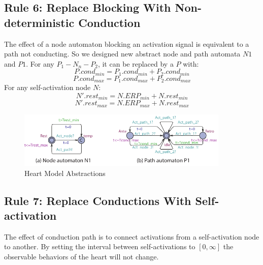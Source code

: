 
\subsection{Rule 6: Replace Blocking With Non-deterministic Conduction}
The effect of a node automaton blocking an activation signal is equivalent to a path not conducting. So we designed new abstract node and path automata $N1$ and $P1$. For any $P_1-N_n-P_2$, it can be replaced by a $P$ with:
$$P.cond_{min}=P_1.cond_{min}+P_2.cond_{min}$$
$$P.cond_{max}=P_1.cond_{max}+P_2.cond_{max}$$
For any self-activation node $N$:
$$N'.rest_{min}=N.ERP_{min}+N.rest_{min}$$
$$N'.rest_{max}=N.ERP_{max}+N.rest_{max}$$

\begin{figure}[!h]
		\centering
		\includegraphics[width=0.9\textwidth]{figs/rule5.pdf}
		\caption{\small Heart Model Abstractions}
		\label{fig:rule5}
\end{figure}

\subsection{Rule 7: Replace Conductions With Self-activation}
The effect of conduction path is to connect activations from a self-activation node to another. By setting the interval between self-activations to $[0,\infty]$ the observable behaviors of the heart will not change.

